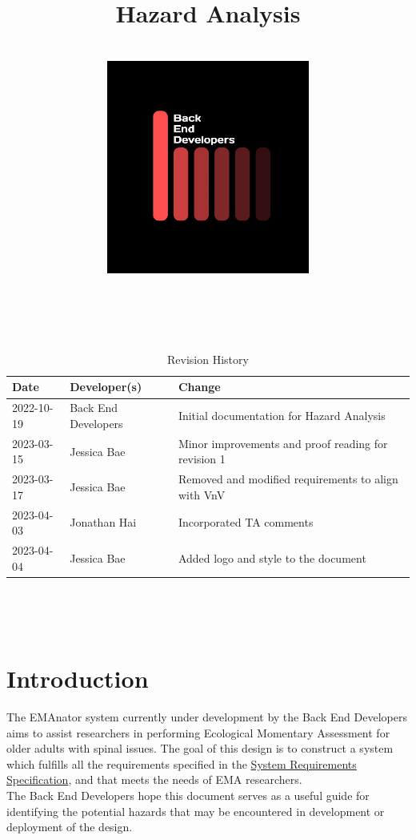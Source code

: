 \documentclass{article}
\title{\textbf{Hazard Analysis\\\progname\\ \vspace{2cm} \includegraphics[width=0.5\textwidth]{../logo.jpg}}}
\author{\authname}
\date{}
\begin{document}
\color{white}\maketitle

\color{black}
\thispagestyle{empty}

~\newpage


\begin{table}[hp]
	\caption{Revision History} \label{TblRevisionHistory}
	\begin{tabularx}{\textwidth}{llX}
		\toprule
		\textbf{Date} & \textbf{Developer(s)} & \textbf{Change}        \\
		\midrule
		2022-10-19   & Back End Developers              & Initial documentation for Hazard Analysis \\
		2023-03-15        & Jessica Bae & Minor improvements and proof reading for revision 1 \\
		2023-03-17        & Jessica Bae & Removed and modified requirements to align with VnV \\
		2023-04-03 & Jonathan Hai & Incorporated TA comments \\
		2023-04-04 & Jessica Bae & Added logo and style to the document \\
		
		\bottomrule
	\end{tabularx}
\end{table}

~\newpage

\tableofcontents
\listoffigures
\listoftables

~\newpage


\section{Introduction}

The EMAnator system currently under development by the Back End Developers aims to assist researchers in performing Ecological Momentary Assessment for older adults with spinal issues. The goal of this design is to construct a system which fulfills all the requirements specified in the \href{https://github.com/zakerl/Capstone_Project/blob/desDoc_Labeeb/docs/SRS/SRS.pdf}{System Requirements Specification}, and that meets the needs of EMA researchers.\\

The Back End Developers hope this document serves as a useful guide for identifying the potential hazards that may be encountered in development or deployment of the design. \\
\end{document}
